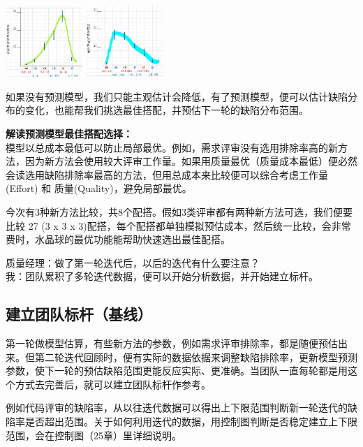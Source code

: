 \includegraphics[width=6cm]{MTKL.png}

如果没有预测模型，我们只能主观估计会降低，有了预测模型，便可以估计缺陷分布的变化，也能帮我们挑选最佳搭配，并预估下一轮的缺陷分布范围。

\textbf{解读预测模型最佳搭配选择：}\\
模型以总成本最低可以防止局部最优。例如，需求评审没有选用排除率高的新方法，因为新方法会使用较大评审工作量。如果用质量最优（质量成本最低）便必然会读选用缺陷排除率最高的方法，但用总成本来比较便可以综合考虑工作量(Effort)
和 质量(Quality)，避免局部最优。

今次有3种新方法比较，共8个配搭。假如3类评审都有两种新方法可选，我们便要比较
27 (3 x 3 x
3)配搭，每个配搭都单独模拟预估成本，然后统一比较，会非常费时，水晶球的最优功能能帮助快速选出最佳配搭。

质量经理：做了第一轮迭代后，以后的迭代有什么要注意？\\
我：团队累积了多轮迭代数据，便可以开始分析数据，并开始建立标杆。\\

\hypertarget{ux5efaux7acbux56e2ux961fux6807ux6746ux57faux7ebf}{%
\subsection{建立团队标杆（基线）}\label{ux5efaux7acbux56e2ux961fux6807ux6746ux57faux7ebf}}

第一轮做模型估算，有些新方法的参数，例如需求评审排除率，都是随便预估出来。但第二轮迭代回顾时，便有实际的数据依据来调整缺陷排除率，更新模型预测参数，使下一轮的预估缺陷范围更能反应实际、更准确。当团队一直每轮都是用这个方式去完善后，就可以建立团队标杆作参考。

例如代码评审的缺陷率，从以往迭代数据可以得出上下限范围判断新一轮迭代的缺陷率是否超出范围。关于如何利用迭代的数据，用控制图判断是否稳定建立上下限范围，会在控制图（25章）里详细说明。


